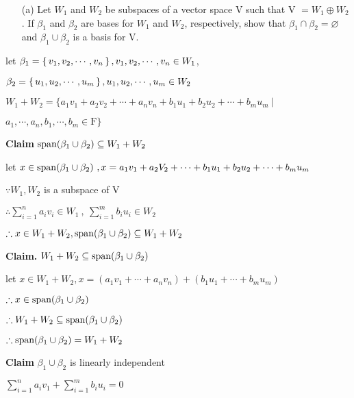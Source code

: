 \begin{enumerate}
	\item[(a)] Let $W_1$ and $W_2$ be subspaces of a vector space V such that V $= W_1 \oplus W_2$. If $\beta_{1}$ and $\beta_{2}$ are bases for $W_1$ and $W_2$, respectively, show that $\beta_1 \cap \beta_2 = \varnothing$ and $\beta_1 \cup \beta_2$ is a basis for V.
\end{enumerate}

\begin{tcolorbox}
	\begin{solution}
		let $\beta_1 = \left\{ \,v_1,v_2,\cdots,v_n \,\right\},v_1,v_2,\cdots,v_n \in W_1$,
		
		 $\beta_2 = \left\{ \,u_1,u_2,\cdots,u_m \,\right\},u_1,u_2,\cdots,u_m \in W_2$
		
		$W_1 + W_2 = \{a_1v_1+a_2v_2+\cdots+a_nv_n+b_1u_1+b_2u_2+\cdots+b_mu_m ~|~  $ 
		
		$a_1,\cdots,a_n,b_1,\cdots,b_m \in \mathrm{F}\} $
		
		\textbf{Claim} $\text{span($\beta_1 \cup \beta_2$)} \subseteq W_1 + W_2$
		
		let $x \in \text{span($\beta_1 \cup \beta_2$)}~, x = a_1v_1 + a_2V_2 + \cdots + b_1u_1 + b_2u_2 + \cdots + b_mu_m$
		
		$\because W_1,W_2$ is a subspace of V
		
		$\therefore \sum^{n}_{i=1}a_iv_i \in W_1~,~ \sum^{m}_{i=1}b_iu_i \in W_2$
		
		$\therefore x \in W_1 + W_2,\text{span($\beta_1 \cup \beta_2$)} \subseteq W_1 + W_2$
		
		\textbf{Claim.} $W_1 + W_2 \subseteq \text{span($\beta_1 \cup \beta_2$)}$
		
		let $x \in W_1 + W_2, x = (a_1v_1 + \cdots + a_nv_n) + (b_1u_1 + \cdots  + b_mu_m)$
		
		$\therefore x \in \text{span($\beta_1 \cup \beta_2$)}$
		
		$\therefore W_1 + W_2 \subseteq \text{span($\beta_1 \cup \beta_2$)}$
		
		$\therefore \text{span($\beta_1 \cup \beta_2$)} = W_1 + W_2$


		\textbf{Claim} ${\beta_1 \cup \beta_2}$ is linearly independent
		
		$\sum^n_{i=1}a_iv_1 + \sum^m_{i=1}b_iu_i = 0$
		

\end{solution}
\end{tcolorbox}
